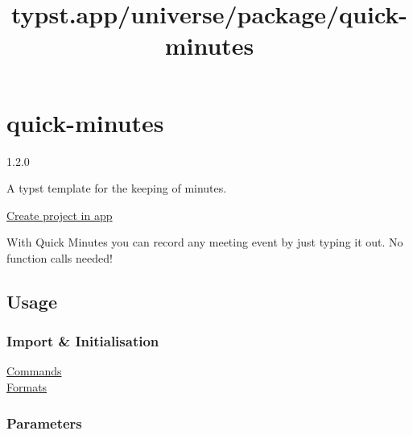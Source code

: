 \title{typst.app/universe/package/quick-minutes}

\label{banner}
\label{template-thumbnail}

\section{quick-minutes}\label{quick-minutes}

{ 1.2.0 }

A typst template for the keeping of minutes.

\href{/app?template=quick-minutes&version=1.2.0}{Create project in app}

\label{readme}
With Quick Minutes you can record any meeting event by just typing it
out. No function calls needed!

\subsection{Usage}\label{usage}

\subsubsection{Import \& Initialisation}\label{import-initialisation}

\begin{Shaded}
\begin{Highlighting}[]

\NormalTok{  )}
\NormalTok{)}

\end{Highlighting}
\end{Shaded}

\href{https://github.com/typst/packages/raw/main/packages/preview/quick-minutes/1.2.0/\#commands}{Commands}\\
\href{https://github.com/typst/packages/raw/main/packages/preview/quick-minutes/1.2.0/\#formats}{Formats}

\subsubsection{Parameters}\label{parameters}

